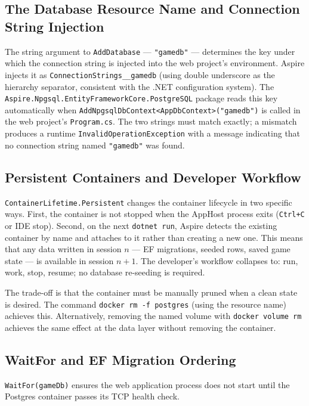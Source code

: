 \subsection{The Database Resource Name and Connection String Injection}

The string argument to \texttt{AddDatabase} --- \texttt{"gamedb"} --- determines the key under which the connection string is injected into the web project's environment. Aspire injects it as \texttt{ConnectionStrings\_\_gamedb} (using double underscore as the hierarchy separator, consistent with the .NET configuration system). The \texttt{Aspire.Npgsql.EntityFrameworkCore.PostgreSQL} package reads this key automatically when \texttt{AddNpgsqlDbContext\textless AppDbContext\textgreater("gamedb")} is called in the web project's \texttt{Program.cs}. The two strings must match exactly; a mismatch produces a runtime \texttt{InvalidOperationException} with a message indicating that no connection string named \texttt{"gamedb"} was found.

\subsection{Persistent Containers and Developer Workflow}

\texttt{ContainerLifetime.Persistent} changes the container lifecycle in two specific ways. First, the container is not stopped when the AppHost process exits (\texttt{Ctrl+C} or IDE stop). Second, on the next \texttt{dotnet run}, Aspire detects the existing container by name and attaches to it rather than creating a new one. This means that any data written in session $n$ --- EF migrations, seeded rows, saved game state --- is available in session $n+1$. The developer's workflow collapses to: run, work, stop, resume; no database re-seeding is required.

The trade-off is that the container must be manually pruned when a clean state is desired. The command \texttt{docker rm -f postgres} (using the resource name) achieves this. Alternatively, removing the named volume with \texttt{docker volume rm} achieves the same effect at the data layer without removing the container.

\subsection{WaitFor and EF Migration Ordering}

\texttt{WaitFor(gameDb)} ensures the web application process does not start until the Postgres container passes its TCP health check.
